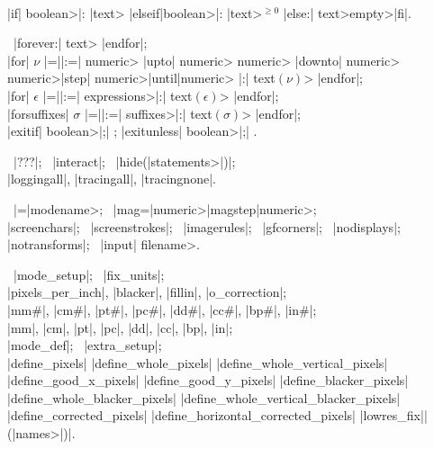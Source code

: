 \medbreak\textindent{}\\
|if| \<boolean>|: |\<text> \bb|elseif|\<boolean>|: |\<text>\ee$^{\ge0}$%
\bb|else:| \<text>\cr\<empty>\ee|fi|.

\smallbreak\textindent{} \ |forever:| \<text> |endfor|;\\
|for| $\nu$ \bb|=|\cr|:=|\ee
\bb\<numeric> |upto| \<numeric>\cr
 \<numeric> |downto| \<numeric>\cr
 \<numeric>\thinspace|step|\thinspace
  \<numeric>\thinspace|until|\thinspace\<numeric>\ee
|:| \<text$(\nu)$> |endfor|;\\
|for| $\epsilon$ \bb|=|\cr|:=|\ee
 \<expressions>|:| \<text$(\epsilon)$> |endfor|;\\
|forsuffixes| $\sigma$ \bb|=|\cr|:=|\ee
 \<suffixes>|:| \<text$(\sigma)$> |endfor|;\\
|exitif| \<boolean>|;| ; \quad
|exitunless| \<boolean>|;| .

\medbreak\textindent{} \
|???|; \ |interact|; \
|hide(|\<statements>|)|;\\
|loggingall|, |tracingall|, |tracingnone|.

\textindent{} \
|\mode=|\<modename>; \ |mag=|\bb\<numeric>\cr|magstep|\<numeric>\ee;\\
|screenchars|; \ |screenstrokes|; \ |imagerules|; \ |gfcorners|; \
|nodisplays|;\\
|notransforms|; \ |input| \<filename>.

\medbreak\textindent\bull {\it ^{Conversion to pixel units}:\/} \
|mode_setup|; \ |fix_units|;\\
|pixels_per_inch|, |blacker|, |fillin|, |o_correction|;\\
|mm#|, |cm#|, |pt#|, |pc#|, |dd#|, |cc#|, |bp#|, |in#|;\\
|mm|, |cm|, |pt|, |pc|, |dd|, |cc|, |bp|, |in|;\\
|mode_def|; \ |extra_setup|;\\
\bb|define_pixels|\cr
|define_whole_pixels|\cr
|define_whole_vertical_pixels|\cr
|define_good_x_pixels|\cr
|define_good_y_pixels|\cr
|define_blacker_pixels|\cr
|define_whole_blacker_pixels|\cr
|define_whole_vertical_blacker_pixels|\cr
|define_corrected_pixels|\cr
|define_horizontal_corrected_pixels|\cr
|lowres_fix|\ee|(|\<names>|)|.

